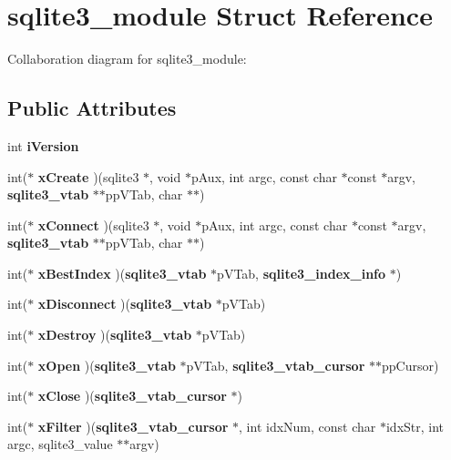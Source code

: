 \section{sqlite3\_\-module Struct Reference}
\label{structsqlite3__module}
Collaboration diagram for sqlite3\_\-module:\subsection*{Public Attributes}
\begin{CompactItemize}
\item 
int {\bf iVersion}\label{structsqlite3__module_1138620d71393e6105389670719d9685}

\item 
int($\ast$ \textbf{xCreate} )(sqlite3 $\ast$, void $\ast$pAux, int argc, const char $\ast$const $\ast$argv, {\bf sqlite3\_\-vtab} $\ast$$\ast$ppVTab, char $\ast$$\ast$)\label{structsqlite3__module_93a4064c04057781ac266ed5974ceb81}

\item 
int($\ast$ \textbf{xConnect} )(sqlite3 $\ast$, void $\ast$pAux, int argc, const char $\ast$const $\ast$argv, {\bf sqlite3\_\-vtab} $\ast$$\ast$ppVTab, char $\ast$$\ast$)\label{structsqlite3__module_19f7accc13ac8ca9bdf5d3924b7eaf2b}

\item 
int($\ast$ \textbf{xBestIndex} )({\bf sqlite3\_\-vtab} $\ast$pVTab, {\bf sqlite3\_\-index\_\-info} $\ast$)\label{structsqlite3__module_f634165424ffccb1ef5dab5ff650eb99}

\item 
int($\ast$ \textbf{xDisconnect} )({\bf sqlite3\_\-vtab} $\ast$pVTab)\label{structsqlite3__module_75840c001112dc870e9e9db39c0d4ed0}

\item 
int($\ast$ \textbf{xDestroy} )({\bf sqlite3\_\-vtab} $\ast$pVTab)\label{structsqlite3__module_f1b772670043b91e5e45a1a6becf9a41}

\item 
int($\ast$ \textbf{xOpen} )({\bf sqlite3\_\-vtab} $\ast$pVTab, {\bf sqlite3\_\-vtab\_\-cursor} $\ast$$\ast$ppCursor)\label{structsqlite3__module_251c7aaab19d614717895337570c4ab1}

\item 
int($\ast$ \textbf{xClose} )({\bf sqlite3\_\-vtab\_\-cursor} $\ast$)\label{structsqlite3__module_23c31c84107f2703d3d5103f14c76ed8}

\item 
int($\ast$ \textbf{xFilter} )({\bf sqlite3\_\-vtab\_\-cursor} $\ast$, int idxNum, const char $\ast$idxStr, int argc, sqlite3\_\-value $\ast$$\ast$argv)\label{structsqlite3__module_699a0a4ea742b78c6f2e8303619c72c2}


\end{CompactItemize}
